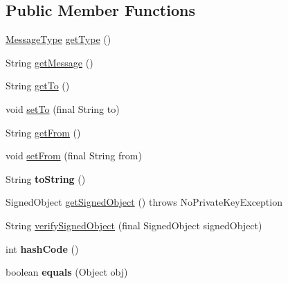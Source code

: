 \subsection*{Public Member Functions}
\begin{DoxyCompactItemize}
\item 
\hyperlink{enumgov_1_1fnal_1_1ppd_1_1dd_1_1chat_1_1MessageType}{Message\-Type} \hyperlink{classgov_1_1fnal_1_1ppd_1_1dd_1_1chat_1_1MessageCarrier_a97b9cb13ecab2e79eb8fcccb7c42e4d3}{get\-Type} ()
\item 
String \hyperlink{classgov_1_1fnal_1_1ppd_1_1dd_1_1chat_1_1MessageCarrier_a5f93bbe4776702ff15bd34473a09a911}{get\-Message} ()
\item 
String \hyperlink{classgov_1_1fnal_1_1ppd_1_1dd_1_1chat_1_1MessageCarrier_a562269f7e4e7472e5607062eed17de44}{get\-To} ()
\item 
void \hyperlink{classgov_1_1fnal_1_1ppd_1_1dd_1_1chat_1_1MessageCarrier_af5f752e29b7861af32fe82c47a959fe5}{set\-To} (final String to)
\item 
String \hyperlink{classgov_1_1fnal_1_1ppd_1_1dd_1_1chat_1_1MessageCarrier_a9f421c900ecd9de7cb468b2d000bc5dc}{get\-From} ()
\item 
void \hyperlink{classgov_1_1fnal_1_1ppd_1_1dd_1_1chat_1_1MessageCarrier_a68a7a204c530fd875ff096f8098667be}{set\-From} (final String from)
\item 
\hypertarget{classgov_1_1fnal_1_1ppd_1_1dd_1_1chat_1_1MessageCarrier_aae023e6861947c5ef768ceb040b01b6d}{String {\bfseries to\-String} ()}\label{classgov_1_1fnal_1_1ppd_1_1dd_1_1chat_1_1MessageCarrier_aae023e6861947c5ef768ceb040b01b6d}

\item 
Signed\-Object \hyperlink{classgov_1_1fnal_1_1ppd_1_1dd_1_1chat_1_1MessageCarrier_aa9e27300a13c639253bf5955d6062495}{get\-Signed\-Object} ()  throws No\-Private\-Key\-Exception 
\item 
String \hyperlink{classgov_1_1fnal_1_1ppd_1_1dd_1_1chat_1_1MessageCarrier_a2ce4e682637b506575889db4917a379f}{verify\-Signed\-Object} (final Signed\-Object signed\-Object)
\item 
\hypertarget{classgov_1_1fnal_1_1ppd_1_1dd_1_1chat_1_1MessageCarrier_a2ef587730f13d97fc9bcf57a371f9543}{int {\bfseries hash\-Code} ()}\label{classgov_1_1fnal_1_1ppd_1_1dd_1_1chat_1_1MessageCarrier_a2ef587730f13d97fc9bcf57a371f9543}

\item 
\hypertarget{classgov_1_1fnal_1_1ppd_1_1dd_1_1chat_1_1MessageCarrier_a43e9cdeae36815d03d8ccd528171a6d9}{boolean {\bfseries equals} (Object obj)}\label{classgov_1_1fnal_1_1ppd_1_1dd_1_1chat_1_1MessageCarrier_a43e9cdeae36815d03d8ccd528171a6d9}

\end{DoxyCompactItemize}

